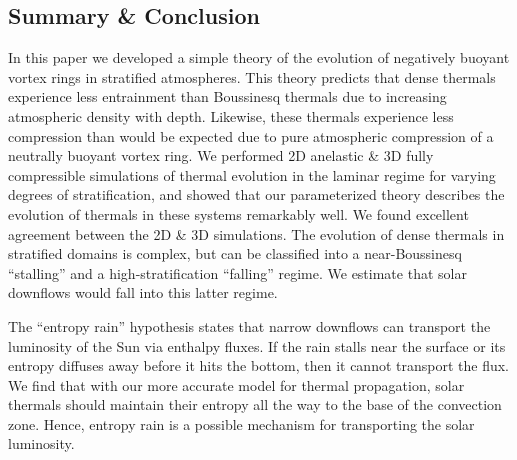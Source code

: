 \subsection{Summary \& Conclusion}
\label{sec:discussion}
In this paper we developed a simple theory of the evolution of negatively buoyant vortex rings in stratified atmospheres.
This theory predicts that dense thermals experience less entrainment than Boussinesq thermals due to increasing atmospheric density with depth.
Likewise, these thermals experience less compression than would be expected due to pure atmospheric compression of a neutrally buoyant vortex ring.
We performed 2D anelastic \& 3D fully compressible simulations of thermal evolution in the laminar regime for varying degrees of stratification, and showed that our parameterized theory describes the evolution of thermals in these systems remarkably well.
We found excellent agreement between the 2D \& 3D simulations.
The evolution of dense thermals in stratified domains is complex, but can be classified into a near-Boussinesq ``stalling'' and a high-stratification ``falling'' regime.
We estimate that solar downflows would fall into this latter regime.

The ``entropy rain'' hypothesis states that narrow downflows can transport the luminosity of the Sun via enthalpy fluxes.
If the rain stalls near the surface or its entropy diffuses away before it hits the bottom, then it cannot transport the flux.
We find that with our more accurate model for thermal propagation, solar thermals should maintain their entropy all the way to the base of the convection zone.
Hence, entropy rain is a possible mechanism for transporting the solar luminosity.



